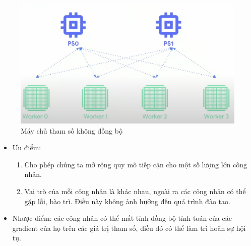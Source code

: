 \documentclass[11pt,a4paper]{article}
\numberwithin{equation}{subsection}
\numberwithin{figure}{subsection}
\numberwithin{table}{subsection}
\begin{document}
\begin{figure}[!h]
\begin{center}
\includegraphics[scale=0.5]{Async.PNG}
\end{center}
\caption{Máy chủ tham số không đồng bộ}
\end{figure}

\begin{itemize}
	\item Ưu điểm:
	\begin{enumerate}[-]
		\item Cho phép chúng ta mở rộng quy mô tiếp cận cho một số lượng lớn công nhân.
		\item Vai trò của mỗi công nhân là khác nhau, ngoài ra các công nhân có thể gặp lỗi, bào trì. Điều này không ảnh hưởng đến quá trình đào tạo.
	\end{enumerate}
	\item Nhược điểm: các công nhân có thể mất tính đồng bộ tính toán của các gradient của họ trên các giá trị tham số, điều đó có thể làm trì hoãn sự hội tụ.
\end{itemize}
\end{document}
